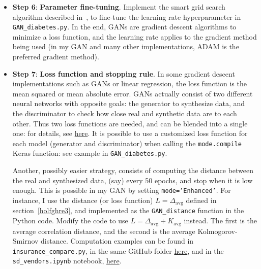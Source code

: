 \documentclass[oneside,10pt]{book}
\begin{document}
\begin{itemize}
\item[] {\bf Step 6}: {\bf Parameter fine-tuning}. Implement the smart grid search algorithm described in~\cite{vgsmart}, to fine-tune the \textcolor{index}{learning rate} 
 hyperparameter in \texttt{GAN\_diabetes.py}. In the end, GANs are \textcolor{index}{gradient descent} algorithms to minimize a \textcolor{index}{loss function}, and the learning rate applies to the gradient method being used (in my GAN and many other implementations,
 ADAM is the preferred gradient method). \vspace{1ex}

\item[] {\bf Step 7}: {\bf Loss function and stopping rule}. In some gradient descent implementations such as GANs or linear regression, the loss function is the mean squared  or mean absolute error. GANs actually consist of two different neural networks with opposite goals: the generator to synthesize data, and the discriminator to check how close real and synthetic data are to each other. Thus two loss functions are needed, and can be blended into a single one: for details, see
 \href{https://neptune.ai/blog/gan-loss-functions}{here}. It is possible to use a customized loss function for each model (generator and discriminator) when calling the \texttt{mode.compile} \textcolor{index}{Keras} function: see example in \texttt{GAN\_diabetes.py}. 

Another, possibly easier strategy, consists of computing the distance between the real and synthesized data, (say) every 50 
\textcolor{index}{epochs}, and stop
 when it is low enough. This is possible in my GAN by setting \texttt{mode='Enhanced'}. For instance, I use the distance (or loss function) 
$L = \Delta_{\text{avg}}$ 
defined in section~\ref{holfghre3}, and implemented as the \texttt{GAN\_distance} function in the Python code. Modify the code to use 
 $L = \Delta_{\text{avg}}+K_{\text{avg}}$ instead. The first is the average \textcolor{index}{correlation distance}, and the second is the average \textcolor{index}{Kolmogorov-Smirnov distance}. Computation examples can be found in \texttt{insurance\_compare.py}, 
in the same GitHub folder \href{https://github.com/VincentGranville/Main}{here},
 and in the \texttt{sd\_vendors.ipynb} notebook, \href{https://github.com/VincentGranville/Notebooks/blob/main/sd_vendors.ipynb}{here}. 
\vspace{1ex}


\end{itemize}
\end{document}
